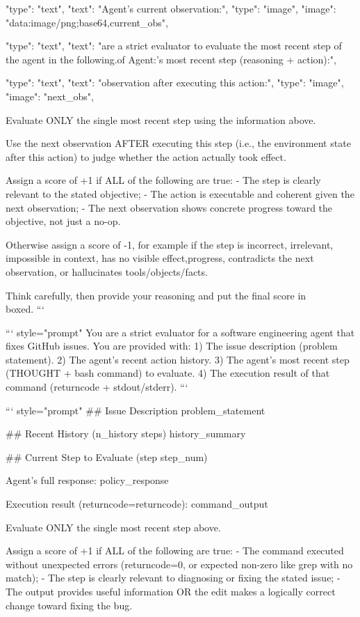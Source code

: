{"type": "text", "text": "Agent's current observation:\n"},
{"type": "image", "image": "data:image/png;base64,{current_obs}"},

{"type": "text", "text": "\nYou are a strict evaluator to evaluate the most recent step of the agent in the following.\n\nObjective of Agent:\n\nAgent's most recent step (reasoning + action):\n"},

{"type": "text", "text": "\nNext observation after executing this action:\n"},
{"type": "image", "image": "{next_obs}"},

Evaluate ONLY the single most recent step using the information above.

Use the next observation AFTER executing this step (i.e., the environment state after this action) to judge whether the action actually took effect.

Assign a score of +1 if ALL of the following are true:
- The step is clearly relevant to the stated objective;
- The action is executable and coherent given the next observation;
- The next observation shows concrete progress toward the objective, not just a no-op.

Otherwise assign a score of -1, for example if the step is incorrect, irrelevant, impossible in context, has no visible effect,\nundoes progress, contradicts the next observation, or hallucinates tools/objects/facts.

Think carefully, then provide your reasoning and put the final score in \\boxed{}.
```


``` {style="prompt"}
You are a strict evaluator for a software engineering agent that fixes GitHub issues.
You are provided with:
1) The issue description (problem statement).
2) The agent's recent action history.
3) The agent's most recent step (THOUGHT + bash command) to evaluate.
4) The execution result of that command (returncode + stdout/stderr).
```


``` {style="prompt"}
## Issue Description
{problem_statement}

## Recent History ({n_history} steps)
{history_summary}

## Current Step to Evaluate (step {step_num})

Agent's full response:
{policy_response}

Execution result (returncode={returncode}):
{command_output}

Evaluate ONLY the single most recent step above.

Assign a score of +1 if ALL of the following are true:
- The command executed without unexpected errors (returncode=0, or expected non-zero like grep with no match);
- The step is clearly relevant to diagnosing or fixing the stated issue;
- The output provides useful information OR the edit makes a logically correct change toward fixing the bug.

